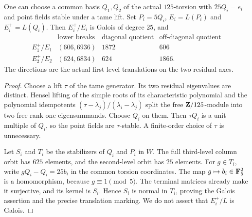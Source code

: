 \begin{proposition}\label{prop:exact-third-point-profiles}
One can choose a common basis $Q_1,Q_2$ of the actual $125$-torsion with $25Q_i=e_i$ and point fields stable under a tame lift. Set $P_i=5Q_i$, $E_i=L(P_i)$ and $E_i^+=L(Q_i)$. Then $E_i^+/E_i$ is Galois of degree $25$, and
\[
\begin{array}{c|c|r|r}
 &\text{lower breaks}&\text{diagonal quotient}&\text{off-diagonal quotient}\\\hline
 E_1^+/E_1&(606,6936)&1872&606\\
 E_2^+/E_2&(624,6834)&624&1866.
\end{array}
\]
The directions are the actual first-level translations on the two residual axes.
\end{proposition}
\begin{proof}
Choose a lift $\tau$ of the tame generator. Its two residual eigenvalues are distinct. Hensel lifting of the simple roots of its characteristic polynomial and the polynomial idempotents
$(\tau-\lambda_j)/(\lambda_i-\lambda_j)$ split the free $\mathbf Z/125$-module into two free rank-one eigensummands. Choose $Q_i$ on them. Then $\tau Q_i$ is a unit multiple of $Q_i$, so the point fields are $\tau$-stable. A finite-order choice of $\tau$ is unnecessary.

Let $S_i$ and $T_i$ be the stabilizers of $Q_i$ and $P_i$ in $W$. The full third-level column orbit has $625$ elements, and the second-level orbit has $25$ elements. For $g\in T_i$, write $gQ_i-Q_i=25b_i$ in the common torsion coordinates. The map $g\mapsto b_i\in\mathbf F_5^2$ is a homomorphism, because $g\equiv1\pmod5$. The terminal matrices already make it surjective, and its kernel is $S_i$. Hence $S_i$ is normal in $T_i$, proving the Galois assertion and the precise translation marking. We do not assert that $E_i^+/L$ is Galois.


\end{proof}
